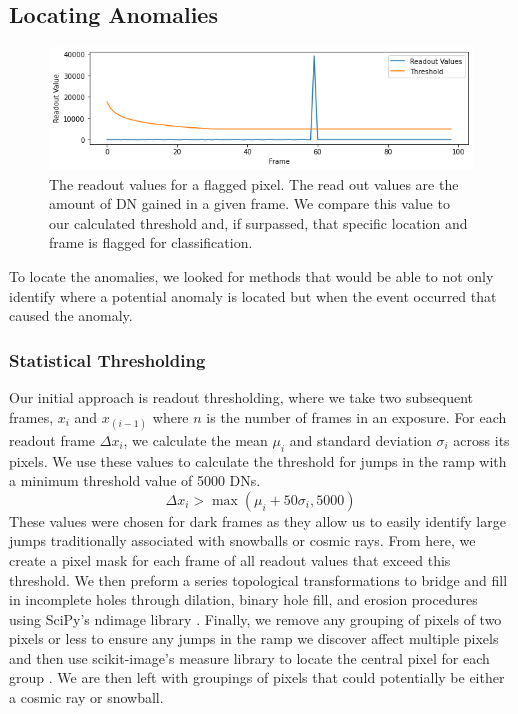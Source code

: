 \subsection{Locating Anomalies}
\begin{figure}[b]
    \centering
    \includegraphics[width=1\linewidth]{figs/rst/Threshold.png}
    \caption{The readout values for a flagged pixel. The read out values are the amount of DN gained in a given frame. We compare this value to our calculated threshold and, if surpassed, that specific location and frame is flagged for classification.}
    \label{rst/fig:threshold}
\end{figure}
To locate the anomalies, we looked for methods that would be able to not only identify where a potential anomaly is located but when the event occurred that caused the anomaly. 
\subsubsection{Statistical Thresholding}
Our initial approach is readout thresholding, where we take two subsequent frames, $x_i$ and $x_{(i-1)}$ where $n$ is the number of frames in an exposure. 
For each readout frame $\Delta x_i$, we calculate the mean $\mu_i$ and standard deviation $\sigma_i$ across its pixels. 
We use these values to calculate the threshold for jumps in the ramp with a minimum threshold value of 5000 DNs.
\begin{equation}
    \Delta x_i > \max(\mu_i + 50 \sigma_i, 5000)
\end{equation}
These values were chosen for dark frames as they allow us to easily identify large jumps traditionally associated with snowballs or cosmic rays. 
From here, we create a pixel mask for each frame of all readout values that exceed this threshold. 
We then preform a series topological transformations to bridge and fill in incomplete holes through dilation, binary hole fill, and erosion procedures using SciPy's ndimage library \parencite{2020SciPy-NMeth}.
Finally, we remove any grouping of pixels of two pixels or less to ensure any jumps in the ramp we discover affect multiple pixels and then use scikit-image's measure library to locate the central pixel for each group \parencite{scikit-image}.
We are then left  with groupings of pixels that could potentially be either a cosmic ray or snowball.


